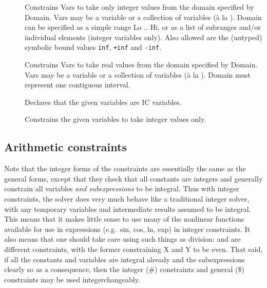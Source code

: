 \begin{description}
\item []
Constrains Vars to take only integer values from the domain
specified by Domain.
Vars may be a variable or a collection of variables (\`a la
).
Domain can be specified as a simple range Lo .. Hi, or as a list
of subranges and/or individual elements (integer variables only).  Also
allowed are the (untyped) symbolic bound values {\tt inf}, {\tt +inf} and
{\tt -inf}.

\item []
Constrains Vars to take real values from the domain specified by
Domain.
Vars may be a variable or a collection of variables (\`a la
).
Domain must represent one contiguous interval.

\item []
Declares that the given variables are IC variables.

\item []
Constrains the given variables to take integer values only.

\end{description}


\subsection{Arithmetic constraints}

Note that the integer forms of the constraints are essentially the same as
the general forms, except that they check that all constants are integers
and generally constrain all variables \emph{and subexpressions} to be
integral.
Thus with integer constraints, the solver does very much behave like a
traditional integer solver, with any temporary variables and intermediate
results assumed to be integral.
This means that it makes little sense to use many of the nonlinear functions
available for use in expressions (e.g.\ sin, cos, ln, exp) in integer
constraints.
It also means that one should take care using such things as division:
 and  are different
constraints, with the former constraining X and Y to be even.
That said, if all the constants and variables are integral already and the
subexpressions clearly so as a consequence, then the integer (\#) constraints
and general (\$) constraints may be used integerchangeably.

